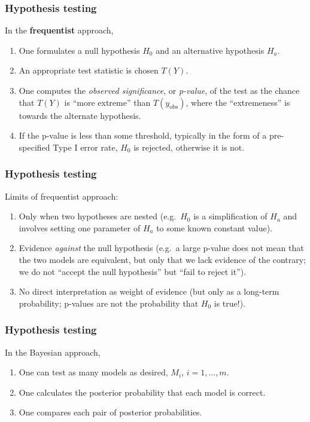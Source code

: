 \documentclass{beamer}
\newcommand{\1}{\ensuremath{\mathbf{1}}}
\begin{document}
%
%
%
\begin{frame}\frametitle{Hypothesis testing}
	In the \textbf{frequentist} approach,
	\begin{enumerate}
		\item One formulates a null hypothesis $H_0$ and an alternative hypothesis $H_a$.
		\item An appropriate test statistic is chosen $T (Y )$.
		\item One computes the \emph{observed significance}, or \emph{p-value}, of the test as the chance that $T(Y)$ is ``more extreme'' than $T(y_\text{obs})$, where the ``extremeness'' is towards the alternate hypothesis.
		\item If the p-value is less than some threshold, typically in the form of a pre-specified Type I error rate, $H_0$ is rejected, otherwise it is not.
	\end{enumerate}
\end{frame}
%
%
%
\begin{frame}\frametitle{Hypothesis testing}
	Limits of frequentist approach:
	\begin{enumerate}
		\item Only when two hypotheses are nested (e.g.\ $H_0$ is a simplification of $H_a$ and involves setting one parameter of $H_a$ to some known constant value).
		\item Evidence \emph{against} the null hypothesis (e.g.\ a large p-value does not mean that the two models are equivalent, but only that we lack evidence of the contrary; we do not ``accept the null hypothesis'' but ``fail to reject it'').
		\item No direct interpretation as weight of evidence (but only as a long-term probability; p-values are not the probability that $H_0$ is true!).
	\end{enumerate}
\end{frame}
%
%
%
\begin{frame}\frametitle{Hypothesis testing}
	In the Bayesian approach,
	\begin{enumerate}
		\item One can test as many models as desired, $M_i$, $i = 1, ..., m$.
		\item One calculates the posterior probability that each model is correct.
		\item One compares each pair of posterior probabilities.
	\end{enumerate}
\end{frame}
\end{document}
